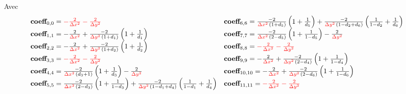 \documentclass[10pt,a4paper, landscape]{article}
\newcommand{\cen}[3]{\frac{-2}{\textcolor{red}{#1}\,#3}\left(1+\frac{1}{#2}\right)}
\newcommand{\cendeux}[4]{\frac{-2}{\textcolor{red}{#1}\,#4}\left(\frac{1}{#2}+\frac{1}{#3}\right)}
\newcommand{\dx}{\Delta x}
\newcommand{\dy}{\Delta y}
\renewcommand{\a}{\textcolor{red}{-\frac{2}{\dx^2} -\frac{2}{\dy^2}}}
\newcommand{\db}{\frac{2}{\textcolor{red}{\dx^2}}}
\newcommand{\dc}{\frac{2}{\textcolor{red}{\dy^2}}}
\begin{document}
Avec
\begin{equation*}
\begin{array}{ll}
	\textbf{coeff}_{0,0} = \a & \textbf{coeff}_{6,6} = \cen{\dx^2}{d_5}{(1+d_5)} + \cendeux{\dy^2}{1-d_2}{d_6}{(1-d_2+d_6)}\\
	\textbf{coeff}_{1,1} = - \db+\cen{\dy^2}{d_1}{(1+d_1)}  & \textbf{coeff}_{7,7} = \cen{\dx^2}{1-d_5}{(2-d_5)}-\dc\\
	\textbf{coeff}_{2,2} = - \db +\cen{\dy^2}{d_2}{(1+d_2)} & \textbf{coeff}_{8,8} = \a\\
	\textbf{coeff}_{3,3} = \a & \textbf{coeff}_{9,9} = -\db+\cen{\dy^2}{1-d_4}{(2-d_4)}\\
	\textbf{coeff}_{4,4} = \cen{\dx^2}{d_3}{(d_3+1)}-\dc & \textbf{coeff}_{10,10} = -\db+\cen{\dy^2}{1-d_6}{(2-d_6)}\\
	\textbf{coeff}_{5,5} = \cen{\dx^2}{1-d_3}{(2-d_3)} + \cendeux{\dy^2}{1-d_1}{d_4}{(1-d_1+d_4)} & \textbf{coeff}_{11,11} = \a	
\end{array}
\end{equation*}


\end{document}
